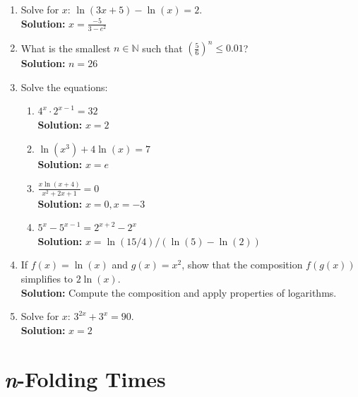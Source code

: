 \documentclass{article}
\begin{document}
\begin{enumerate}[leftmargin = 0.5cm, label = \arabic*., rightmargin = 0.2cm]
    \item Solve for $x$: $\ln(3x + 5) - \ln(x) = 2$. \\
    \textbf{Solution:} \( x = \frac{-5}{3 - e^2} \)

    \item What is the smallest $n \in \mathbb{N}$ such that $\left( \frac{5}{6} \right)^n \leq 0.01$? \\
    \textbf{Solution:} \( n = 26 \)

    \item Solve the equations:
    
    \begin{enumerate}[leftmargin = 0.5cm, label = (\alph*), rightmargin = 0.2cm]
    
        \item $4^x \cdot 2^{x-1} = 32$ \\ \textbf{Solution:} \( x = 2 \)
        \item $\ln(x^3) + 4 \ln(x) = 7$ \\ \textbf{Solution:} \( x = e \)
        \item $\frac{x \ln(x + 4)}{x^2 + 2x + 1} = 0$ \\ \textbf{Solution:} \( x = 0, x = -3 \)
        \item $5^x - 5^{x-1} = 2^{x+2} - 2^{x}$ \\ \textbf{Solution:} \( x = \ln(15/4)/(\ln(5)-\ln(2))\)
    
    \end{enumerate}

    \item If $f(x) = \ln(x)$ and $g(x) = x^2$, show that the composition $f(g(x))$ simplifies to $2 \ln(x)$. \\
    \textbf{Solution:} Compute the composition and apply properties of logarithms.

    \item Solve for $x$: $3^{2x} + 3^x = 90$. \\
    \textbf{Solution:} \( x = 2 \)

\end{enumerate}

\section{\textit{n}-Folding Times}
\end{document}
